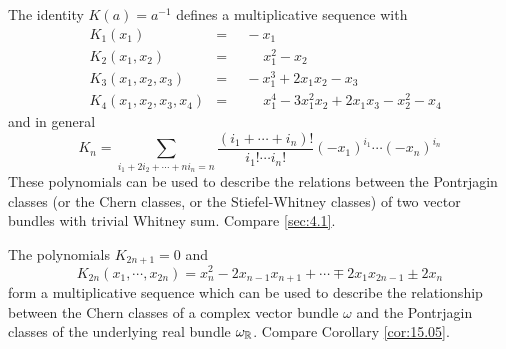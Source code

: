 \documentclass[../main]{subfiles}
\begin{document}
\begin{example}
The identity $K(a) = a^{-1}$ defines a multiplicative sequence with 
\[\begin{aligned}
    &K_1(x_1) &=& \,\,\,-x_1 \\
    &K_2(x_1,x_2) &=& \,\,\,\phantom{+\,\,\,}x_1^2 - x_2 \\
    &K_3(x_1,x_2,x_3) &=&\,\,\, -x_1^3 +2x_1x_2 -x_3 \\
    &K_4(x_1,x_2,x_3,x_4) &=& \,\,\,\phantom{+\,\,\,}x_1^4 -3x_1^2x_2 + 2x_1x_3 -x_2^2 -x_4 
\end{aligned}\]
and in general \[K_n = \sum_{i_1 + 2i_2 + \cdots + ni_n =n} \frac{(i_1 + \cdots + i_n)!}{i_1! \cdots i_n!}(-x_1)^{i_1}\cdots(-x_n)^{i_n} \]
These polynomials can be used to describe the relations between the Pontrjagin classes (or the Chern classes, or the Stiefel-Whitney classes) of two vector bundles with trivial Whitney sum. Compare \ref{sec:4.1}.
\end{example}

\begin{example}
The polynomials $K_{2n+1} =0$ and \[K_{2n}(x_1,\cdots,x_{2n}) = x_n^2 - 2x_{n-1}x_{n+1} + \cdots \mp 2x_1x_{2n-1} \pm 2x_n\] form a multiplicative sequence which can be used to describe the relationship between the Chern classes of a complex vector bundle $\omega$ and the Pontrjagin classes of the underlying real bundle $\omega_\mathbb R$. Compare Corollary \ref{cor:15.05}.
\end{example}
\end{document}
